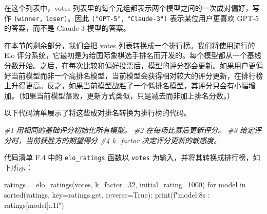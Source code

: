在这个列表中，votes 列表里的每个元组都表示两个模型之间的一次成对偏好，写作 \texttt{(winner,} \texttt{loser)}。因此 \texttt{(}\texttt{"}\texttt{GPT-5}\texttt{"}\texttt{,} \texttt{"}\texttt{Claude-3}\texttt{"}\texttt{)} 表示某位用户更喜欢 GPT-5 的答案，而不是 Claude-3 模型的答案。

在本节的剩余部分，我们会把 votes 列表转换成一个排行榜。我们将使用流行的 Elo 评分系统，它最初是为给国际象棋选手排名而开发的。每个模型都从一个基线分数开始。之后，在每次比较和偏好投票后，模型的评分都会更新。如果用户更偏好当前模型而非一个高排名模型，当前模型会获得相对较大的评分更新，在排行榜上升得更高。反之，如果当前模型战胜了一个低排名模型，其评分只会有小幅增加。（如果当前模型落败，更新方式类似，只是减去而非加上排名分数。）

以下代码清单展示了将这些成对排名转换为排行榜的代码。

{\noindent\small\textit{\#1 用相同的基础评分初始化所有模型。 \newline \#2 在每场比赛后更新评分。 \newline \#3 给定评分时，当前获胜方的期望得分 \newline \#4 k\_factor 决定评分更新的敏感度。}\par}

代码清单 F.4 中的 \texttt{elo\_ratings} 函数以 \texttt{votes} 为输入，并将其转换成排行榜，如下所示：

\begin{codebox}
ratings = elo_ratings(votes, k_factor=32, initial_rating=1000)
for model in sorted(ratings, key=ratings.get, reverse=True):
    print(f"{model:8s} : {ratings[model]:.1f}")
\end{codebox}

